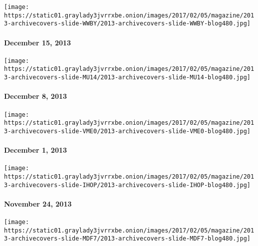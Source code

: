 \texttt{[image: https://static01.graylady3jvrrxbe.onion/images/2017/02/05/magazine/2013-archivecovers-slide-WWBY/2013-archivecovers-slide-WWBY-blog480.jpg]}

\hypertarget{december-15-2013}{%
\paragraph{December 15, 2013}\label{december-15-2013}}

\href{http://www.nytimes3xbfgragh.onion/indexes/2013/12/08/magazine/index.html}{}

\texttt{[image: https://static01.graylady3jvrrxbe.onion/images/2017/02/05/magazine/2013-archivecovers-slide-MU14/2013-archivecovers-slide-MU14-blog480.jpg]}

\hypertarget{december-8-2013}{%
\paragraph{December 8, 2013}\label{december-8-2013}}

\href{http://www.nytimes3xbfgragh.onion/indexes/2013/12/01/magazine/index.html}{}

\texttt{[image: https://static01.graylady3jvrrxbe.onion/images/2017/02/05/magazine/2013-archivecovers-slide-VME0/2013-archivecovers-slide-VME0-blog480.jpg]}

\hypertarget{december-1-2013}{%
\paragraph{December 1, 2013}\label{december-1-2013}}

\href{http://www.nytimes3xbfgragh.onion/indexes/2013/11/24/magazine/index.html}{}

\texttt{[image: https://static01.graylady3jvrrxbe.onion/images/2017/02/05/magazine/2013-archivecovers-slide-IHOP/2013-archivecovers-slide-IHOP-blog480.jpg]}

\hypertarget{november-24-2013}{%
\paragraph{November 24, 2013}\label{november-24-2013}}

\href{http://www.nytimes3xbfgragh.onion/indexes/2013/11/17/magazine/index.html}{}

\texttt{[image: https://static01.graylady3jvrrxbe.onion/images/2017/02/05/magazine/2013-archivecovers-slide-MDF7/2013-archivecovers-slide-MDF7-blog480.jpg]}

